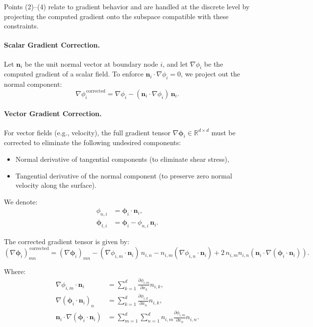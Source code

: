 \documentclass[12pt]{extarticle}
\newcommand{\<}{\langle}
\renewcommand{\>}{\rangle}
\theoremstyle{definition}
\begin{document}
Points (2)–(4) relate to gradient behavior and are handled at the discrete level by projecting the computed gradient onto the subspace compatible with these constraints.

\paragraph{Scalar Gradient Correction.}
Let \( \boldsymbol{n}_i \) be the unit normal vector at boundary node \( i \), and let \( \nabla \phi_i \) be the computed gradient of a scalar field. To enforce \( \boldsymbol{n}_i \cdot \nabla \phi_i = 0 \), we project out the normal component:
\[
\nabla \phi_i^{\,\text{corrected}} = \nabla \phi_i - (\boldsymbol{n}_i \cdot \nabla \phi_i)\, \boldsymbol{n}_i.
\]

\paragraph{Vector Gradient Correction.}
For vector fields (e.g., velocity), the full gradient tensor \( \nabla \boldsymbol{\phi}_i \in \mathbb{R}^{d \times d} \) must be corrected to eliminate the following undesired components:
\begin{itemize}
  \item Normal derivative of tangential components (to eliminate shear stress),
  \item Tangential derivative of the normal component (to preserve zero normal velocity along the surface).
\end{itemize}

We denote:
\begin{align*}
\phi_{n,i} &= \boldsymbol{\phi}_i \cdot \boldsymbol{n}_i, \\
\boldsymbol{\phi}_{t,i} &= \boldsymbol{\phi}_i - \phi_{n,i}\, \boldsymbol{n}_i.
\end{align*}

The corrected gradient tensor is given by:
\begin{equation}
(\nabla \boldsymbol{\phi}_i)^{\,\text{corrected}}_{mn} =
(\nabla \boldsymbol{\phi}_i)_{mn}
- (\nabla \phi_{i,m} \cdot \boldsymbol{n}_i)\, n_{i,n}
- n_{i,m} (\nabla \phi_{i,n} \cdot \boldsymbol{n}_i)
+ 2\, n_{i,m} n_{i,n} \left(\boldsymbol{n}_i \cdot \nabla (\boldsymbol{\phi}_i \cdot \boldsymbol{n}_i)\right).
\end{equation}

Where:
\begin{align*}
\nabla \phi_{i,m} \cdot \boldsymbol{n}_i &= \sum_{k=1}^d \frac{\partial \phi_{i,m}}{\partial x_k} n_{i,k}, \\
\nabla (\boldsymbol{\phi}_i \cdot \boldsymbol{n}_i)_n &= \sum_{k=1}^d \frac{\partial \phi_{i,k}}{\partial x_n} n_{i,k}, \\
\boldsymbol{n}_i \cdot \nabla (\boldsymbol{\phi}_i \cdot \boldsymbol{n}_i) &= \sum_{m=1}^d \sum_{n=1}^d n_{i,m} \frac{\partial \phi_{i,m}}{\partial x_n} n_{i,n}.
\end{align*}
\end{document}
